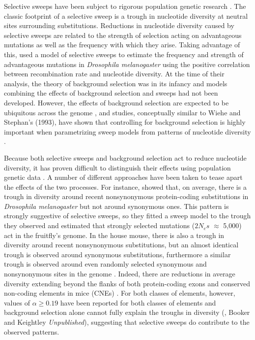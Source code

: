\documentclass[11pt]{article}
\begin{document}
Selective sweeps have been subject to rigorous population genetic research \citep{RN124, RN226, RN278, RN235}. The classic footprint of a selective sweep is a trough in nucleotide diversity at neutral sites surrounding substitutions. Reductions in nucleotide diversity caused by selective sweeps are related to the strength of selection acting on advantageous mutations as well as the frequency with which they arise. Taking advantage of this, \cite{RN277} used a model of selective sweeps to estimate the frequency and strength of advantageous mutations in \textit{Drosophila melanogaster} using the positive correlation between recombination rate and nucleotide diversity. At the time of their analysis, the theory of background selection was in its infancy and models combining the effects of background selection and sweeps had not been developed. However, the effects of background selection are expected to be ubiquitous across the genome \citep{RN116, RN274, RN120}, and studies, conceptually similar to Wiehe and Stephan's (1993), have shown that controlling for background selection is highly important when parametrizing sweep models from patterns of nucleotide diversity \citep{RN323, RN274}.

Because both selective sweeps and background selection act to reduce nucleotide diversity, it has proven difficult to distinguish their effects using population genetic data \citep{RN339}. A number of different approaches have been taken to tease apart the effects of the two processes. For instance, \cite{RN167} showed that, on average, there is a trough in diversity around recent nonsynonymous protein-coding substitutions in \textit{Drosophila melanogaster} but not around synonymous ones. This pattern is strongly suggestive of selective sweeps, so they \citep{RN167} fitted a sweep model to the trough they observed and estimated that strongly selected mutations ($2N_es$ $\approx$ 5,000) act in the fruitfly's genome.  In the house mouse, there is also a trough in diversity around recent nonsynonymous substitutions, but an almost identical trough is observed around synonymous substitutions, furthermore a similar trough is observed around even randomly selected synonymous and nonsynonymous sites in the genome \citep{RN122}. Indeed, there are reductions in average diversity extending beyond the flanks of both protein-coding exons and conserved non-coding elements in mice (CNEs) \citep{RN122}. For both classes of elements, however, values of $\alpha \geq 0.19$ have been reported for both classes of elements \citep{RN122} and background selection alone cannot fully explain the troughs in diversity (\citealt{RN122}, Booker and Keightley \textit{Unpublished}), suggesting that selective sweeps do contribute to the observed patterns.
\end{document}
